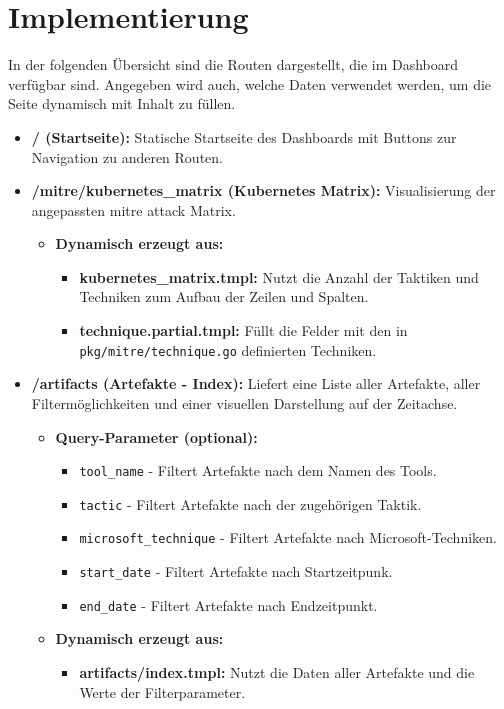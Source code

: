 \chapter{Implementierung}
\label{chap:implementierung}
In der folgenden Übersicht sind die Routen dargestellt, die im Dashboard verfügbar sind. Angegeben wird auch, welche Daten verwendet werden, um die Seite dynamisch mit Inhalt zu füllen.

\begin{itemize}
    \item \textbf{/ (Startseite):} Statische Startseite des Dashboards mit Buttons zur Navigation zu anderen Routen.
    
    \item \textbf{/mitre/kubernetes\_matrix (Kubernetes Matrix):} Visualisierung der angepassten \gls{mitre} \gls{attack} Matrix.
    \begin{itemize}
        \item \textbf{Dynamisch erzeugt aus:}
        \begin{itemize}
            \item \textbf{kubernetes\_matrix.tmpl:} Nutzt die Anzahl der Taktiken und Techniken zum Aufbau der Zeilen und Spalten. 
            \item \textbf{technique.partial.tmpl:} Füllt die Felder mit den in \verb|pkg/mitre/technique.go| definierten Techniken.
        \end{itemize}
    \end{itemize}
    
    \item \textbf{/artifacts (Artefakte - Index):} Liefert eine Liste aller Artefakte, aller Filtermöglichkeiten und einer visuellen Darstellung auf der Zeitachse.
    \begin{itemize}
        \item \textbf{Query-Parameter (optional):}
        \begin{itemize}
            \item \texttt{tool\_name} - Filtert Artefakte nach dem Namen des Tools.
            \item \texttt{tactic} - Filtert Artefakte nach der zugehörigen Taktik.
            \item \texttt{microsoft\_technique} - Filtert Artefakte nach Microsoft-Techniken.
            \item \texttt{start\_date} - Filtert Artefakte nach Startzeitpunk.
            \item \texttt{end\_date} - Filtert Artefakte nach Endzeitpunkt.
        \end{itemize}
        \item \textbf{Dynamisch erzeugt aus:} 
        \begin{itemize}
            \item \textbf{artifacts/index.tmpl:} Nutzt die Daten aller Artefakte und die Werte der Filterparameter.
        \end{itemize}
    \end{itemize}
    

\end{itemize}
